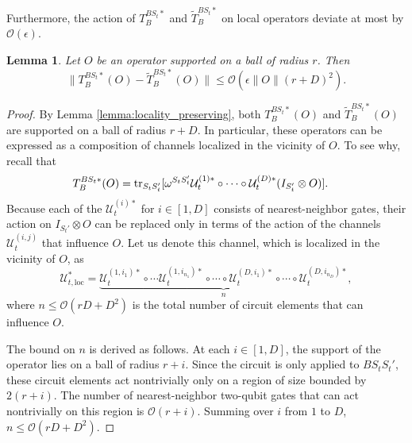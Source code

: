 \documentclass[prx,aps,amsmath,amssymb,floatfix,superscriptaddress,11pt,tightenlines,longbibliography,onecolumn,notitlepage]{revtex4-1}
\newcommand{\Tr}{\textnormal{tr}}
\newtheorem{lem}{Lemma}
\begin{document}
Furthermore, the action of $T_B^{BS_t*}$ and $\tilde{T}_B^{BS_t*}$ on local operators deviate at most by $\mathcal{O}(\epsilon)$.
\begin{lem}
\label{lemma:local_approximate_equivalence}
  Let $O$  be an operator supported on a ball of radius $r$. Then
  \begin{equation}
    \|T_B^{BS_t*}(O) - \tilde{T}_B^{BS_t*}(O) \| \leq \mathcal{O}(\epsilon \|O \|(r+D)^2).
  \end{equation}
\end{lem}
\begin{proof}
  By Lemma \ref{lemma:locality_preserving}, both $T_B^{BS_t*}(O)$ and $\tilde{T}_B^{BS_t*}(O)$ are supported on a ball of radius $r+D$. In particular, these operators can be expressed as a composition of channels localized in the vicinity of $O$. To see why, recall that
  \begin{equation}
    \begin{aligned}
      T_B^{BS_t*}(O) &= \Tr_{S_tS_t'}[\omega^{S_tS_t'} \mathcal{U}_t^{(1)*}\circ \cdots \circ \mathcal{U}_t^{(D)*}(I_{S_t'} \otimes O)].
    \end{aligned}
  \end{equation}
  Because each of the $\mathcal{U}_t^{(i)*}$ for $i\in [1,D]$ consists of nearest-neighbor gates, their action on $I_{S_t'} \otimes O$ can be replaced only in terms of the action of the channels $\mathcal{U}_t^{(i,j)}$ that influence $O$. Let us denote this channel, which is localized in the vicinity of $O$, as
  \begin{equation}
    \mathcal{U}_{t,\text{loc}}^* = \underbrace{\mathcal{U}_{t}^{(1,i_1)*}\circ \cdots \mathcal{U}_t^{(1,i_{n_1})*} \circ \cdots \circ \mathcal{U}_t^{(D,i_1)*} \circ \cdots \circ \mathcal{U}_t^{(D,i_{n_D})*}}_{n},
  \end{equation}
  where $n\leq \mathcal{O}(rD+D^2)$ is the total number of circuit elements that can influence $O$.

  The bound on $n$ is derived as follows. At each $i\in [1,D]$, the support of the operator lies on a ball of radius $r+i$. Since the circuit is only applied to $BS_tS_t'$, these circuit elements act nontrivially only on a region of size bounded by $2(r+i)$. The number of nearest-neighbor two-qubit gates that can act nontrivially on this region is $\mathcal{O}(r+i)$. Summing over $i$ from $1$ to $D$, $n\leq\mathcal{O}(rD+D^2)$.


\end{proof}
\end{document}

